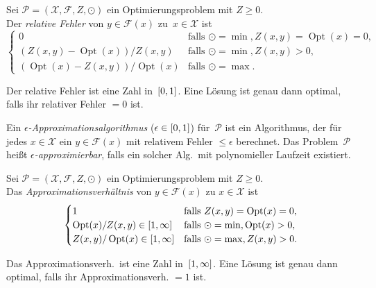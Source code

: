 \documentclass{cheat-sheet}
\newcommand{\Instances}{\mathcal{X}} %
\newcommand{\Feasible}{\mathcal{F}} %
\newcommand{\ObjFun}{Z} %
\newcommand{\Goal}{\odot} %
\newcommand{\OptTuple}{(\Instances{}, \Feasible{}, \ObjFun{}, \Goal)} %
\DeclareMathOperator{\Opt}{Opt} %
\newcommand{\Prob}{\mathcal{P}} %
\begin{document}
\begin{defn}
  Sei $\Prob = \OptTuple$ ein Optimierungsproblem mit $Z \geq 0$. \\
  Der \emph{relative Fehler} von $y \in \Feasible(x)$ zu~$x \in \Instances$ ist
  \[
    \begin{cases}
      0 & \text{falls } \Goal = \min, \ObjFun(x, y) = \Opt(x) = 0, \\
      (\ObjFun(x, y) - \Opt(x)) / \ObjFun(x, y) & \text{falls } \Goal = \min, Z(x, y) > 0, \\
      (\Opt(x) - \ObjFun(x, y)) / \Opt(x) & \text{falls } \Goal = \max.
    \end{cases}
  \]
\end{defn}

\begin{bem}
  Der relative Fehler ist eine Zahl in~$\left[ 0, 1 \right]$.
  Eine Lösung ist genau dann optimal, falls ihr relativer Fehler $= 0$ ist.
\end{bem}

\begin{defn}
  Ein \emph{$\epsilon$-Approximationsalgorithmus} ($\epsilon \in \left[ 0, 1 \right]$) für~$\Prob$ ist ein Algorithmus, der für jedes $x \in \Instances$ ein $y \in \Feasible(x)$ mit relativem Fehler $\leq \epsilon$ berechnet.
  Das Problem~$\Prob$ heißt \emph{$\epsilon$-approximierbar}, falls ein solcher Alg.\ mit polynomieller Laufzeit existiert.
\end{defn}

\begin{defn}
  Sei $\Prob = \OptTuple$ ein Optimierungsproblem mit $Z \geq 0$. \\
  Das \emph{Approximationsverhältnis} von $y \in \Feasible(x)$ zu $x \in \Instances$ ist
  \[
    \begin{cases}
      1 & \text{falls } \ObjFun(x, y) = \Opt(x) = 0, \\
      \Opt(x) / \ObjFun(x, y) \in \cinterval{1}{\infty} & \text{falls } \Goal = \min, \Opt(x) > 0, \\
      \ObjFun(x, y) / \Opt(x) \in \cinterval{1}{\infty} & \text{falls } \Goal = \max, \ObjFun(x, y) > 0.
    \end{cases}
  \]
\end{defn}

\begin{bem}
  Das Approximationsverh.\ ist eine Zahl in~$\left[ 1, \infty \right]$.
  Eine Lösung ist genau dann optimal, falls ihr Approximationsverh. $= 1$ ist.
\end{bem}
\end{document}
